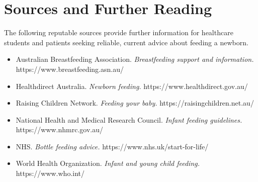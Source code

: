 \section*{Sources and Further Reading}
The following reputable sources provide further information for healthcare students and patients seeking reliable, current advice about feeding a newborn.
\begin{itemize}
    \item Australian Breastfeeding Association. \textit{Breastfeeding support and information.} https://www.breastfeeding.asn.au/
    \item Healthdirect Australia. \textit{Newborn feeding.} https://www.healthdirect.gov.au/
    \item Raising Children Network. \textit{Feeding your baby.} https://raisingchildren.net.au/
    \item National Health and Medical Research Council. \textit{Infant feeding guidelines.} https://www.nhmrc.gov.au/
    \item NHS. \textit{Bottle feeding advice.} https://www.nhs.uk/start-for-life/
    \item World Health Organization. \textit{Infant and young child feeding.} https://www.who.int/
\end{itemize}
